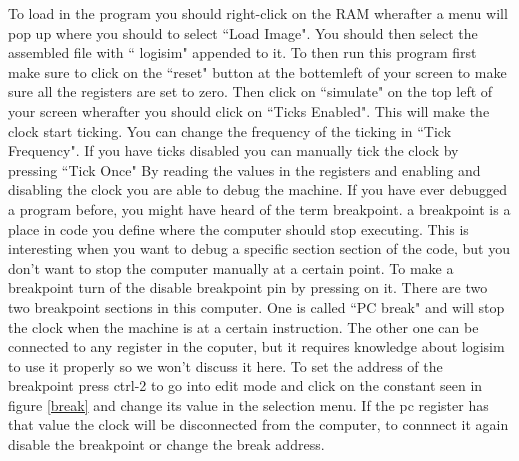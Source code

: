 \documentclass{article}
\begin{document}
To load in the program you should right-click on the RAM wherafter a menu will pop up where you should to select ``Load Image". You should then select the assembled file with `` logisim" appended to it. To then run this program first make sure to click on the ``reset" button at the bottemleft of your screen to make sure all the registers are set to zero. Then click on ``simulate" on the top left of your screen wherafter you should click on ``Ticks Enabled". This will make the clock start ticking. You can change the frequency of the ticking in ``Tick Frequency". If you have ticks disabled you can manually tick the clock by pressing ``Tick Once" By reading the values in the registers and enabling and disabling the clock you are able to debug the machine. If you have ever debugged a program before, you might have heard of the term breakpoint. a breakpoint is a place in code you define where the computer should stop executing. This is interesting when you want to debug a specific section section of the code, but you don't want to stop the computer manually at a certain point. To make a breakpoint turn of the disable breakpoint pin by pressing on it. There are two two breakpoint sections in this computer. One is called ``PC break" and will stop the clock when the machine is at a certain instruction. The other one can be connected to any register in the coputer, but it requires knowledge about logisim to use it properly so we won't discuss it here. To set the address of the breakpoint press ctrl-2 to go into edit mode and click on the constant seen in figure \ref{break} and change its value in the selection menu. If the pc register has that value the clock will be disconnected from the computer, to connnect it again disable the breakpoint or change the break address.
\end{document}
